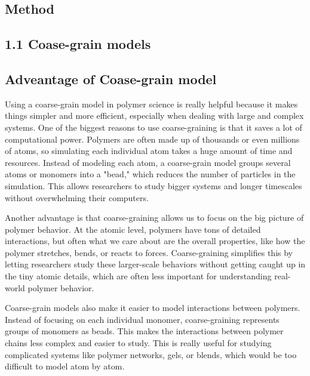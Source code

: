 \documentclass[12pt]{article}
\begin{document}
\begin{flushleft}
\vspace{-1em} 
\section*{Method} 
\vspace{-1em} 
\subsection*{1.1 Coase-grain models}
\vspace{-1em} 
\subsection*{Adveantage of Coase-grain model}



	Using a coarse-grain model in polymer science is really helpful because it makes things simpler and more efficient, especially when dealing with large and complex systems. One of the biggest reasons to use coarse-graining is that it saves a lot of computational power. Polymers are often made up of thousands or even millions of atoms, so simulating each individual atom takes a huge amount of time and resources. Instead of modeling each atom, a coarse-grain model groups several atoms or monomers into a "bead," which reduces the number of particles in the simulation. This allows researchers to study bigger systems and longer timescales without overwhelming their computers.

	Another advantage is that coarse-graining allows us to focus on the big picture of polymer behavior. At the atomic level, polymers have tons of detailed interactions, but often what we care about are the overall properties, like how the polymer stretches, bends, or reacts to forces. Coarse-graining simplifies this by letting researchers study these larger-scale behaviors without getting caught up in the tiny atomic details, which are often less important for understanding real-world polymer behavior.
	
	Coarse-grain models also make it easier to model interactions between polymers. Instead of focusing on each individual monomer, coarse-graining represents groups of monomers as beads. This makes the interactions between polymer chains less complex and easier to study. This is really useful for studying complicated systems like polymer networks, gels, or blends, which would be too difficult to model atom by atom.\\
	

\end{flushleft}
\end{document}
